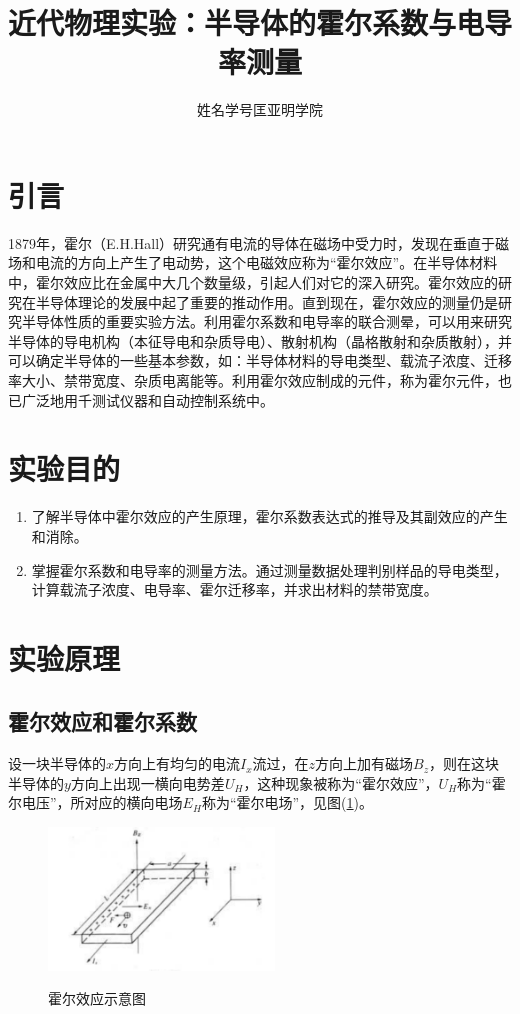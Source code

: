 \documentclass[a4paper]{article}
\title{近代物理实验：半导体的霍尔系数与电导率测量}
\author{ 姓名\quad 学号\quad 匡亚明学院}
\date{}
\begin{document}
	\maketitle
	
	
\section{引言}
1879年，霍尔（E.H.Hall）研究通有电流的导体在磁场中受力时，发现在垂直于磁场和电流的方向上产生了电动势，这个电磁效应称为“霍尔效应”。在半导体材料中，霍尔效应比在金属中大几个数量级，引起人们对它的深入研究。霍尔效应的研究在半导体理论的发展中起了重要的推动作用。直到现在，霍尔效应的测量仍是研究半导体性质的重要实验方法。利用霍尔系数和电导率的联合测晕，可以用来研究半导体的导电机构（本征导电和杂质导电）、散射机构（晶格散射和杂质散射），并可以确定半导体的一些基本参数，如：半导体材料的导电类型、载流子浓度、迁移率大小、禁带宽度、杂质电离能等。利用霍尔效应制成的元件，称为霍尔元件，也已广泛地用千测试仪器和自动控制系统中。

\section{实验目的}
\begin{enumerate}
	\item 了解半导体中霍尔效应的产生原理，霍尔系数表达式的推导及其副效应的产生和消除。
	\item 掌握霍尔系数和电导率的测量方法。通过测量数据处理判别样品的导电类型，计算载流子浓度、电导率、霍尔迁移率，并求出材料的禁带宽度。
\end{enumerate}

\section{实验原理}
\subsection{霍尔效应和霍尔系数}
设一块半导体的$x$方向上有均匀的电流$I_x$流过，在$z$方向上加有磁场$B_z$，则在这块半导体的$y$方向上出现一横向电势差$U_H$，这种现象被称为“霍尔效应”，$U_H$称为“霍尔电压”，所对应的横向电场$E_H$称为“霍尔电场”，见图(\ref{fig1})。
\begin{figure}[!h]
	\centering
	\includegraphics[width=6cm]{fig/fig1.png}\\
	\caption{霍尔效应示意图}\label{fig1}
\end{figure}
\end{document}
